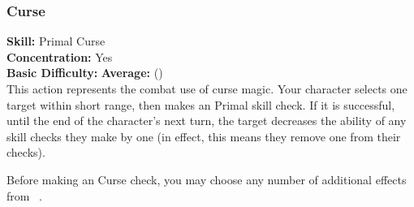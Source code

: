 \subsubsection{Curse}
\textbf{Skill:} Primal Curse\\
\textbf{Concentration:} Yes\\
\textbf{Basic Difficulty:} \textbf{Average:} (\difficulty\difficulty)\\
This action represents the combat use of curse magic. Your
character selects one target within short range, then makes
an Primal skill check.  If it is successful, until the
end of the character’s next turn, the target decreases the
ability of any skill checks they make by one (in effect, this
means they remove one \proficiency from their checks).
 
Before making an Curse check, you may choose any number of
additional effects from ~.
